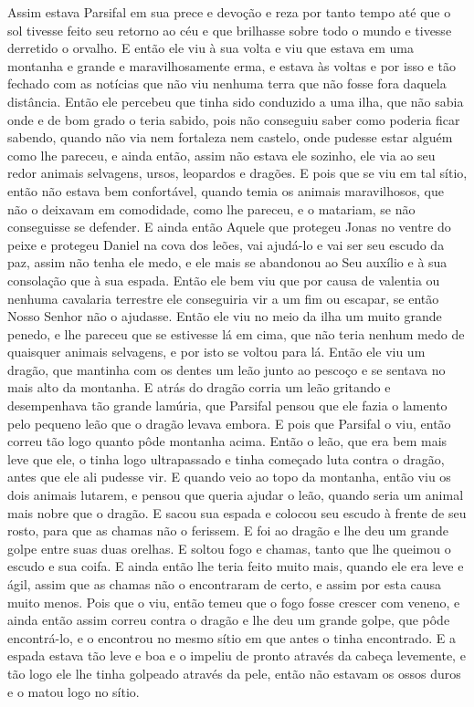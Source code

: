 Assim estava Parsifal em sua prece e devoção e reza por tanto tempo até que
o sol tivesse feito seu retorno ao céu e que brilhasse sobre todo o mundo e
tivesse derretido o orvalho. E então ele viu à sua volta e viu que estava em
uma montanha e grande e maravilhosamente erma, e estava às voltas e por isso e
tão fechado com as notícias que não viu nenhuma terra que não fosse fora
daquela distância. Então ele percebeu que tinha sido conduzido a uma ilha, que
não sabia onde e de bom grado o teria sabido, pois não conseguiu saber como
poderia ficar sabendo, quando não via nem fortaleza nem castelo, onde pudesse
estar alguém como lhe pareceu, e ainda então, assim não estava ele sozinho, ele
via ao seu redor animais selvagens, ursos, leopardos e dragões. E pois que se
viu em tal sítio, então não estava bem confortável, quando temia os animais
maravilhosos, que não o deixavam em comodidade, como lhe pareceu, e o matariam,
se não conseguisse se defender. E ainda então Aquele que protegeu Jonas no
ventre do peixe e protegeu Daniel na cova dos leões, vai ajudá-lo e vai ser seu
escudo da paz, assim não tenha ele medo, e ele mais se abandonou ao Seu auxílio
e à sua consolação que à sua espada. Então ele bem viu que por causa de
valentia ou nenhuma cavalaria terrestre ele conseguiria vir a um fim ou
escapar, se então Nosso Senhor não o ajudasse. Então ele viu no meio da ilha um
muito grande penedo, e lhe pareceu que se estivesse lá em cima, que não teria
nenhum medo de quaisquer animais selvagens, e por isto se voltou para lá. Então
ele viu um dragão, que mantinha com os dentes um leão junto ao pescoço e se
sentava no mais alto da montanha. E atrás do dragão corria um leão gritando e
desempenhava tão grande lamúria, que Parsifal pensou que ele fazia o lamento
pelo pequeno leão que o dragão levava embora. E pois que Parsifal o viu, então
correu tão logo quanto pôde montanha acima. Então o leão, que era bem mais leve
que ele, o tinha logo ultrapassado e tinha começado luta contra o dragão, antes
que ele ali pudesse vir. E quando veio ao topo da montanha, então viu os dois
animais lutarem, e pensou que queria ajudar o leão, quando seria um animal mais
nobre que o dragão. E sacou sua espada e colocou seu escudo à frente de seu
rosto, para que as chamas não o ferissem. E foi ao dragão e lhe deu um grande
golpe entre suas duas orelhas. E soltou fogo e chamas, tanto que lhe queimou o
escudo e sua coifa. E ainda então lhe teria feito muito mais, quando ele era
leve e ágil, assim que as chamas não o encontraram de certo, e assim por esta
causa muito menos. Pois que o viu, então temeu que o fogo fosse crescer com
veneno, e ainda então assim correu contra o dragão e lhe deu um grande golpe,
que pôde encontrá-lo, e o encontrou no mesmo sítio em que antes o tinha
encontrado. E a espada estava tão leve e boa e o impeliu de pronto através da
cabeça levemente, e tão logo ele lhe tinha golpeado através da pele, então não
estavam os ossos duros e o matou logo no sítio. 

